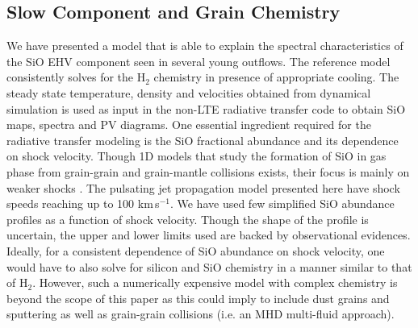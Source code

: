 \documentclass[useAMS,usenatbib]{mn2e}
\begin{document}
\subsection{Slow Component and Grain Chemistry}
%
We have presented a model that is able to explain the spectral characteristics
of the SiO EHV component seen
in several young outflows. The reference model
consistently solves for the H$_{2}$ chemistry in presence of
appropriate cooling. The steady state temperature, density and velocities obtained from dynamical
simulation is used as input in the non-LTE radiative transfer code to obtain SiO maps, spectra and PV
diagrams. One essential ingredient required for the radiative transfer modeling
is the SiO fractional abundance and its dependence on shock velocity. 
Though 1D models that study the formation of SiO in gas phase from grain-grain and grain-mantle
collisions exists, their focus is mainly on weaker shocks
\citep{Schilke:1997p14140, Caselli:1997p14853, Gusdorf:2008p13800}. 
The pulsating jet propagation model presented here have shock speeds
reaching up to 100 km\,s$^{-1}$. We have used few
simplified SiO abundance profiles as a function of shock
velocity. Though the shape of the profile is uncertain, the upper and
lower limits used are backed by observational evidences. Ideally, for a consistent
dependence of SiO abundance on shock velocity, one would have to also
solve for silicon and SiO chemistry in a manner similar to that of
H$_{2}$. However, such a numerically expensive model 
with complex chemistry is beyond the scope of this paper 
as this could imply to include dust grains and sputtering 
as well as grain-grain collisions (i.e. an MHD multi-fluid approach).  
%
\end{document}
